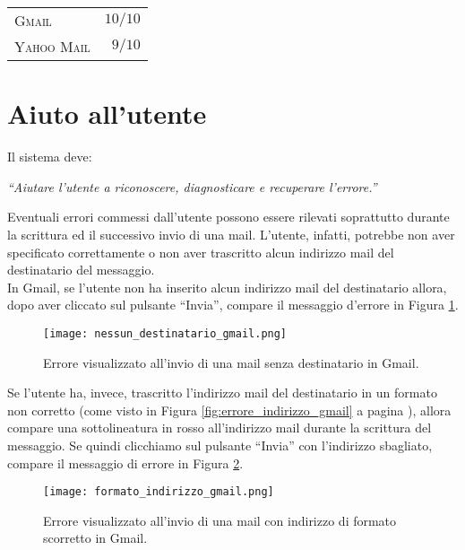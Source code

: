 		\begin{flushleft}
			\begin{tabular}{lr}
				\textsc{Gmail} & $10/10$\\
				\textsc{Yahoo Mail} & $9/10$
			\end{tabular}
		\end{flushleft}
	
	\section{Aiuto all'utente} \label{sec:aiuto_utente}
	
		Il sistema deve:
		\begin{center}
			\begin{minipage}{0.7\textwidth}
				\textit{``Aiutare l'utente a riconoscere, diagnosticare e recuperare l'errore.''}
			\end{minipage}
		\end{center}
	
		Eventuali errori commessi dall'utente possono essere rilevati soprattutto durante la scrittura ed il successivo invio di una mail. L'utente, infatti, potrebbe non aver specificato correttamente o non aver trascritto alcun indirizzo mail del destinatario del messaggio.\\
		In Gmail, se l'utente non ha inserito alcun indirizzo mail del destinatario allora, dopo aver cliccato sul pulsante ``Invia'', compare il messaggio d'errore in Figura \ref{fig:nessun_destinatario_gmail}.
		\begin{figure}[h!]
			\begin{center}
				\texttt{[image: nessun\_destinatario\_gmail.png]}
			\end{center}
			\caption[Errore di nessun destinatario in Gmail]{Errore visualizzato all'invio di una mail senza destinatario in Gmail.}
			\label{fig:nessun_destinatario_gmail}
		\end{figure}
		
		Se l'utente ha, invece, trascritto l'indirizzo mail del destinatario in un formato non corretto (come visto in Figura \ref{fig:errore_indirizzo_gmail} a pagina \pageref{fig:errore_indirizzo_gmail}), allora compare una sottolineatura in rosso all'indirizzo mail durante la scrittura del messaggio. Se quindi clicchiamo sul pulsante ``Invia'' con l'indirizzo sbagliato, compare il messaggio di errore in Figura \ref{fig:formato_indirizzo_gmail}.
		\begin{figure}[h!]
			\begin{center}
				\texttt{[image: formato\_indirizzo\_gmail.png]}
			\end{center}
			\caption[Errore di indirizzo con formato sbagliato in Gmail]{Errore visualizzato all'invio di una mail con indirizzo di formato scorretto in Gmail.}
			\label{fig:formato_indirizzo_gmail}
		\end{figure}
		
